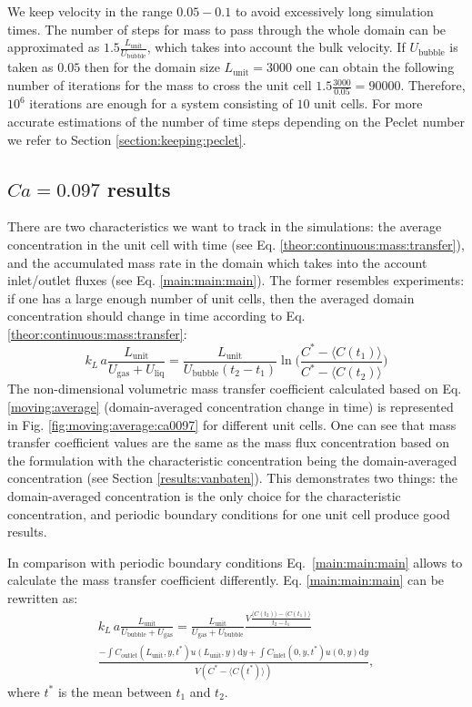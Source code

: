 \documentclass[preprint,12pt]{elsarticle}
\newcommand{\beq}{\begin{equation}}
\newcommand{\feq}{\end{equation}}
\newcommand{\vol}{k_L\,a}
\newcommand{\lunit}{L_{\mathrm{unit}}}
\newcommand{\ububble}{U_{\mathrm{bubble}}}
\newcommand{\uliq}{U_{\mathrm{liq}}}
\newcommand{\ugas}{U_{\mathrm{gas}}}
\newcommand{\cinlet}{C_{\mathrm{inlet}}}
\newcommand{\coutlet}{C_{\mathrm{outlet}}}
\newcommand{\cstar}{C^{*}}
\newcommand{\volnondim}{\vol \frac{\lunit}{\ububble+\ugas}}
\begin{document}
We keep velocity in the range $0.05-0.1$ to avoid excessively long simulation times.
The number of steps for mass to pass through the whole domain can be approximated as $1.5 \frac{\lunit}{\ububble}$, which takes into account the bulk
velocity. If $\ububble$ is taken as $0.05$ then for
the domain size $\lunit=3000$ one can obtain the following number of iterations for the mass to
cross the unit cell $1.5 \frac{3000}{0.05}=90000$. Therefore, $10^{6}$ iterations are enough
for a system consisting of $10$ unit cells. For more accurate estimations of the number of time
steps depending on the Peclet number we refer to Section \ref{section:keeping:peclet}.

\subsection{$Ca=0.097$ results}
There are two characteristics we want to track in the simulations: the average
concentration in
the unit cell with time (see Eq. \ref{theor:continuous:mass:transfer}), and the accumulated mass
rate in the domain which takes into the account inlet/outlet fluxes (see Eq. \ref{main:main:main}). The former
resembles experiments: if one has a large enough number of unit cells, then the averaged domain
concentration should change in time according to Eq. \ref{theor:continuous:mass:transfer}: 
\beq
\label{moving:average}
\vol\frac{\lunit}{\ugas+\uliq}=\frac{\lunit}{\ububble (t_2
-t_1)}\ln\biggl(\frac{C^*-\langle C(t_1) \rangle}{C^*-\langle C(t_2)\rangle}\biggr)
\feq
The non-dimensional volumetric mass transfer coefficient calculated based on Eq.
\ref{moving:average} (domain-averaged concentration change in time) is
represented in Fig. \ref{fig:moving:average:ca0097} for different unit cells. One can see that mass transfer coefficient values are the same as the mass flux
concentration based on the \citeauthor{vanbaten-circular} formulation with the characteristic
concentration being the domain-averaged concentration (see Section
\ref{results:vanbaten}). This demonstrates two things:  the domain-averaged
concentration is the only choice for the characteristic concentration, and
periodic boundary conditions for one unit cell produce good results.

In comparison with periodic boundary conditions Eq.~\ref{main:main:main} allows
to calculate the mass transfer coefficient differently. Eq.
\ref{main:main:main}  can be rewritten as: \beq
\label{main:main:main:thorough}
\begin{aligned}
\volnondim=\frac{\lunit}{\ugas+\ububble} \frac{V \frac{\langle C(t_2)\rangle - \langle C(t_1)
\rangle}{t_2-t_1}}{}\\
\frac{-\int{\coutlet(\lunit,y,t^*) u(\lunit,y) \mathrm{d} y}+\int{\cinlet(0,y,t^*)
u(0,y)\mathrm{d} y}}{V (\cstar - \langle C(t^*) \rangle)},
\end{aligned}
\feq
where $t^*$ is the mean between $t_1$ and $t_2$.
\end{document}
